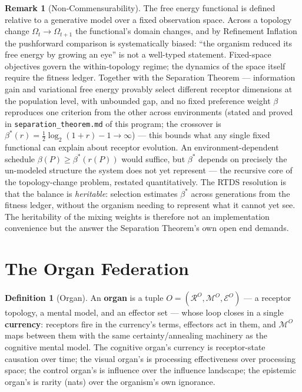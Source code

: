 \documentclass[12pt]{article}
\theoremstyle{definition}
\newtheorem{definition}{Definition}
\newtheorem{remark}{Remark}
\begin{document}
\begin{remark}[Non-Commensurability]
The free energy functional is defined relative to a generative model over a fixed
observation space. Across a topology change $\Omega_t \to \Omega_{t+1}$ the functional's
domain changes, and by Refinement Inflation the pushforward comparison is systematically
biased: ``the organism reduced its free energy by growing an eye'' is not a well-typed
statement. Fixed-space objectives govern the within-topology regime; the dynamics of the
space itself require the fitness ledger. Together with the Separation Theorem ---
information gain and variational free energy provably select different receptor
dimensions at the population level, with unbounded gap, and no fixed preference
weight $\beta$ reproduces one criterion from the other across environments
(stated and proved in \texttt{separation\_theorem.md} of this program; the
crossover is $\beta^*(r) = \tfrac{1}{2}\log_2(1+r) - 1 \to \infty$) --- this bounds
what any single fixed functional can explain about receptor evolution. An
environment-dependent schedule $\beta(P) \geq \beta^*(r(P))$ would suffice, but
$\beta^*$ depends on precisely the un-modeled structure the system does not yet
represent --- the recursive core of the topology-change problem, restated
quantitatively. The RTDS resolution is that the balance is \emph{heritable}:
selection estimates $\beta^*$ across generations from the fitness ledger, without
the organism needing to represent what it cannot yet see. The heritability of the
mixing weights is therefore not an implementation convenience but the answer the
Separation Theorem's own open end demands.
\end{remark}

\section{The Organ Federation}

\begin{definition}[Organ]
An \textbf{organ} is a tuple $O = (\mathcal{R}^O, \mathcal{M}^O, \mathcal{E}^O)$ --- a
receptor topology, a mental model, and an effector set --- whose loop closes in a single
\textbf{currency}: receptors fire in the currency's terms, effectors act in them, and
$\mathcal{M}^O$ maps between them with the same certainty/annealing machinery as the
cognitive mental model. The cognitive organ's currency is receptor-state causation over
time; the visual organ's is processing effectiveness over processing space; the control
organ's is influence over the influence landscape; the epistemic organ's is rarity (nats)
over the organism's own ignorance.
\end{definition}
\end{document}
